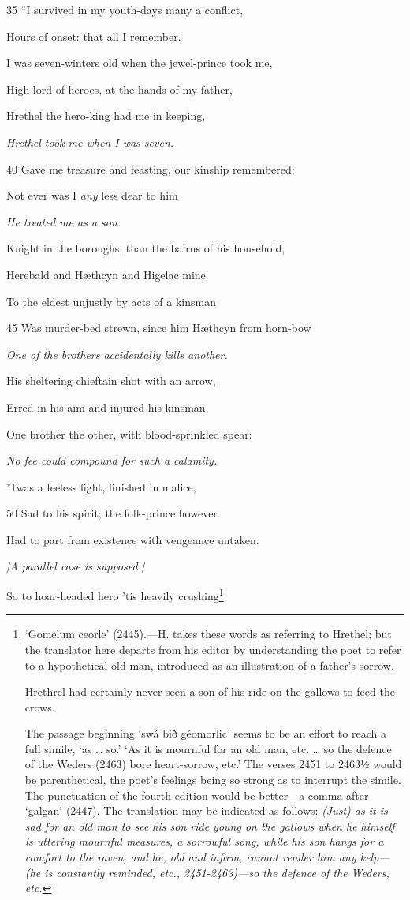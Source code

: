 35
“I survived in my youth-days many a conflict,

Hours of onset: that all I remember.

I was seven-winters old when the jewel-prince took me,

High-lord of heroes, at the hands of my father,

Hrethel the hero-king had me in keeping,

\emph{Hrethel took me
when I was seven.}

40
Gave me treasure and feasting, our kinship remembered;

Not ever was I \emph{any} less dear to him

\emph{He treated me as
a son.}

Knight in the boroughs, than the bairns of his household,

Herebald and Hæthcyn and Higelac mine.

To the eldest unjustly by acts of a kinsman

45
Was murder-bed strewn, since him Hæthcyn from horn-bow

\emph{One of the brothers
accidentally kills
another.}

His sheltering chieftain shot with an arrow,

Erred in his aim and injured his kinsman,

One brother the other, with blood-sprinkled spear:

\emph{No fee could compound
for such a
calamity.}

’Twas a feeless fight, finished in malice,

50
Sad to his spirit; the folk-prince however

Had to part from existence with vengeance untaken.

\emph{[A parallel case
is supposed.]}

So to hoar-headed hero ’tis heavily crushing\footnote{‘Gomelum ceorle’ (2445).—H. takes these words as referring to Hrethel;
but the translator here departs from his editor by understanding the poet to
refer to a hypothetical old man, introduced as an illustration of a father’s
sorrow.

Hrethrel had certainly never seen a son of his ride on the gallows to feed
the crows.

The passage beginning ‘swá bið géomorlic’ seems to be an effort to reach
a full simile, ‘as … so.’ ‘As it is mournful for an old man, etc. … so the
defence of the Weders (2463) bore heart-sorrow, etc.’ The verses 2451 to
2463½ would be parenthetical, the poet’s feelings being so strong as to interrupt
the simile. The punctuation of the fourth edition would be better—a
comma after ‘galgan’ (2447). The translation may be indicated as follows:
\emph{(Just) as it is sad for an old man to see his son ride young on the gallows when
he himself is uttering mournful measures, a sorrowful song, while his son hangs
for a comfort to the raven, and he, old and infirm, cannot render him any
kelp—(he is constantly reminded, etc., 2451-2463)—so the defence of the
Weders, etc.}}

